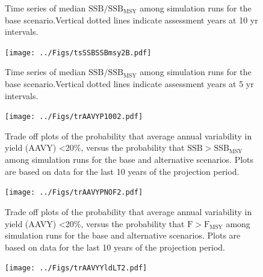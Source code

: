 \documentclass[12pt,english]{article}
\begin{document}
\begin{appendix}
\begin{figure}[!ht]
\begin{center}
\end{center}
\begin{flushleft}
\caption{Time series of median $\mathrm{SSB/SSB_{MSY}}$ among simulation runs for the base scenario.Vertical dotted lines indicate assessment years at 10 yr intervals.}
\label{fig:tsSSBSSBmsy2}
\end{flushleft}
\end{figure}
\clearpage\begin{figure}[!ht]
\begin{center}
\texttt{[image: ../Figs/tsSSBSSBmsy2B.pdf]}
\end{center}
\begin{flushleft}
\caption{Time series of median $\mathrm{SSB/SSB_{MSY}}$ among simulation runs for the base scenario.Vertical dotted lines indicate assessment years at 5 yr intervals.}
\label{fig:tsSSBSSBmsy2B}
\end{flushleft}
\end{figure}
\clearpage
\begin{figure}[!ht]
\begin{center}
\texttt{[image: ../Figs/trAAVYP1002.pdf]}
\end{center}
\begin{flushleft}
\caption{Trade off plots of the probability that average annual variability in yield (AAVY) <20\%, versus  the probability that $\mathrm{SSB > SSB_{MSY}}$ among simulation runs for the base and alternative scenarios. Plots are based on data for the last 10 years of the projection period.}
\label{fig:trAAVYP1002}
\end{flushleft}
\end{figure}
\clearpage\begin{figure}[!ht]
\begin{center}
\texttt{[image: ../Figs/trAAVYPNOF2.pdf]}
\end{center}
\begin{flushleft}
\caption{Trade off plots of the probability that average annual variability in yield (AAVY) <20\%, versus  the probability that $\mathrm{F > F_{MSY}}$ among simulation runs for the base and alternative scenarios. Plots are based on data for the last 10 years of the projection period.}
\label{fig:trAAVYPNOF2}
\end{flushleft}
\end{figure}
\clearpage\begin{figure}[!ht]
\begin{center}
\texttt{[image: ../Figs/trAAVYYldLT2.pdf]}
\end{center}

\end{figure}
\end{appendix}
\end{document}
